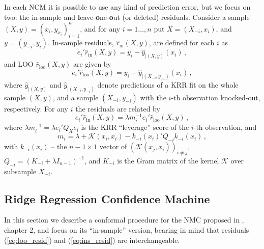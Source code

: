 \documentclass[conference]{IEEEtran}
\newcommand{\Kcal}{\mathcal{K}}
\begin{document}
In each NCM it is possible to use any kind of prediction error, but we focus on two:
the in-sample and \textbf{l}eave-\textbf{o}ne-\textbf{o}ut (or deleted) residuals.
Consider a sample $(X, y) = (x_i, y_{x_i})_{i=1}^n$, and for any $i=1\ldots, n$ put
$X = (X_{-i}, x_i)$, and $y = (y_{-i}, y_i)$. In-sample residuals, $\hat{r}_{\text{in}}(X, y)$,
are defined for each $i$ as
\begin{equation} \label{eq:ins_resid}
  e_i' \hat{r}_{\text{in}}(X, y) = y_i - \hat{y}_{|(X, y)}(x_i) \,,
\end{equation}
and LOO $\hat{r}_{\text{loo}}(X, y)$ are given by
\begin{equation} \label{eq:loo_resid}
  e_i' \hat{r}_{\text{loo}}(X, y) = y_i - \hat{y}_{|(X_{-i}, y_{-i})}(x_i) \,,
\end{equation}
where $\hat{y}_{|(X, y)}$ and $\hat{y}_{|(X_{-i}, y_{-i})}$ denote predictions of
a KRR fit on the whole sample $(X, y)$, and a sample $(X_{-i}, y_{-i})$ with the
$i$-th observation knocked-out, respectively. For any $i$ the residuals are related
by
\begin{equation}
  e_i' \hat{r}_{\text{in}}(X, y)
    = \lambda m_i^{-1} e_i' \hat{r}_{\text{loo}}(X, y)
    \,,
\end{equation}
where $\lambda m_i^{-1} = \lambda e_i'Q_X e_i$ is the KRR ``leverage'' score of
the $i$-th observation, and
\begin{equation} \label{eq:krr_leverage}
  m_i = \lambda + \Kcal(x_i, x_i) - k_{-i}(x_i)' Q_{-i} k_{-i}(x_i) \,,
\end{equation}
with $k_{-i}(x_i)$ -- the $n-1\times 1$ vector of $(\Kcal(x_j, x_i))_{i\neq j}$,
$Q_{-i} = (K_{-i} + \lambda I_{n-1})^{-1}$, and $K_{-i}$ is the Gram matrix of
the kernel $\Kcal$ over subsample $X_{-i}$.


\subsection{Ridge Regression Confidence Machine} %
\label{sub:ridge_regression_confidence_machine}

In this section we describe a conformal procedure for the NMC proposed in \cite{vovk2005},
chapter 2, and focus on its ``in-sample'' version, bearing in mind that residuals
(\ref{eq:loo_resid}) and (\ref{eq:ins_resid}) are interchangeable.
\end{document}
